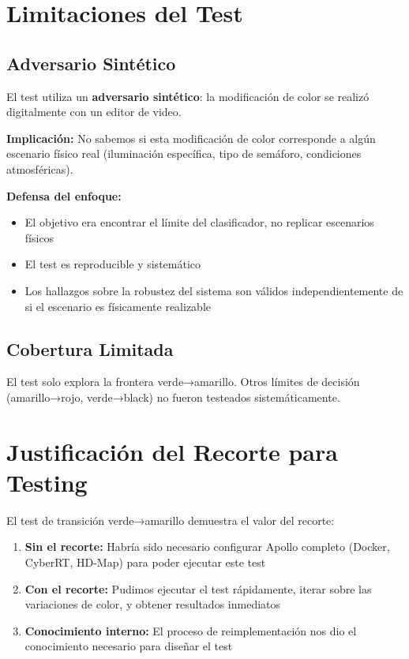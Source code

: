 \section{Limitaciones del Test}

\subsection{Adversario Sintético}

El test utiliza un \textbf{adversario sintético}: la modificación de color se realizó digitalmente con un editor de video.

\textbf{Implicación:} No sabemos si esta modificación de color corresponde a algún escenario físico real (iluminación específica, tipo de semáforo, condiciones atmosféricas).

\textbf{Defensa del enfoque:}
\begin{itemize}
    \item El objetivo era encontrar el límite del clasificador, no replicar escenarios físicos
    \item El test es reproducible y sistemático
    \item Los hallazgos sobre la robustez del sistema son válidos independientemente de si el escenario es físicamente realizable
\end{itemize}

\subsection{Cobertura Limitada}

El test solo explora la frontera verde→amarillo. Otros límites de decisión (amarillo→rojo, verde→black) no fueron testeados sistemáticamente.

\section{Justificación del Recorte para Testing}

El test de transición verde→amarillo demuestra el valor del recorte:

\begin{enumerate}
    \item \textbf{Sin el recorte:} Habría sido necesario configurar Apollo completo (Docker, CyberRT, HD-Map) para poder ejecutar este test

    \item \textbf{Con el recorte:} Pudimos ejecutar el test rápidamente, iterar sobre las variaciones de color, y obtener resultados inmediatos

    \item \textbf{Conocimiento interno:} El proceso de reimplementación nos dio el conocimiento necesario para diseñar el test
\end{enumerate}

